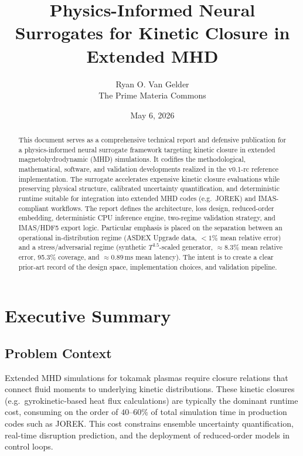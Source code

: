 \documentclass[11pt]{article}
\title{Physics-Informed Neural Surrogates for Kinetic Closure in Extended MHD}
\author{%
  Ryan O. Van Gelder \\ The Prime Materia Commons%
}
\date{May 6, 2026}
\begin{document}
\maketitle

\begin{abstract}
This document serves as a comprehensive technical report and defensive publication for a physics-informed neural surrogate framework targeting kinetic closure in extended magnetohydrodynamic (MHD) simulations. It codifies the methodological, mathematical, software, and validation developments realized in the v0.1-rc reference implementation. The surrogate accelerates expensive kinetic closure evaluations while preserving physical structure, calibrated uncertainty quantification, and deterministic runtime suitable for integration into extended MHD codes (e.g.\ JOREK) and IMAS-compliant workflows. The report defines the architecture, loss design, reduced-order embedding, deterministic CPU inference engine, two-regime validation strategy, and IMAS/HDF5 export logic. Particular emphasis is placed on the separation between an operational in-distribution regime (ASDEX Upgrade data, $<1\%$ mean relative error) and a stress/adversarial regime (synthetic $T^{3.5}$-scaled generator, $\approx 8.3\%$ mean relative error, 95.3\% coverage, and $\approx 0.89$\,ms mean latency). The intent is to create a clear prior-art record of the design space, implementation choices, and validation pipeline.
\end{abstract}

\tableofcontents

\section{Executive Summary}

\subsection{Problem Context}

Extended MHD simulations for tokamak plasmas require closure relations that connect fluid moments to underlying kinetic distributions. These kinetic closures (e.g.\ gyrokinetic-based heat flux calculations) are typically the dominant runtime cost, consuming on the order of $40$--$60\%$ of total simulation time in production codes such as JOREK. This cost constrains ensemble uncertainty quantification, real-time disruption prediction, and the deployment of reduced-order models in control loops.
\end{document}
